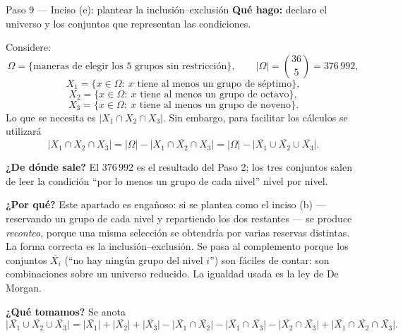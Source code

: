 \documentclass[11pt]{article}
\begin{document}
\begin{paso}{Paso 9 --- Inciso (e): plantear la inclusión--exclusión}
\textbf{Qué hago:} declaro el universo y los conjuntos que representan las condiciones.

Considere:
\[
  \Omega = \{\text{maneras de elegir los 5 grupos sin restricción}\},\qquad |\Omega| = \binom{36}{5} = 376\,992 ,
\]
\[
  X_1 = \{x\in\Omega:\ x \text{ tiene al menos un grupo de séptimo}\},
\]
\[
  X_2 = \{x\in\Omega:\ x \text{ tiene al menos un grupo de octavo}\},
\]
\[
  X_3 = \{x\in\Omega:\ x \text{ tiene al menos un grupo de noveno}\} .
\]
Lo que se necesita es $|X_1\cap X_2\cap X_3|$. Sin embargo, para facilitar los cálculos se utilizará
\[
  |X_1\cap X_2\cap X_3| = |\Omega| - \big|\overline{X_1\cap X_2\cap X_3}\big| = |\Omega| - \big|\overline{X_1}\cup \overline{X_2}\cup \overline{X_3}\big| .
\]

\textbf{¿De dónde sale?} El $376\,992$ es el resultado del Paso 2; los tres conjuntos salen de leer la condición ``por lo menos un grupo de cada nivel'' nivel por nivel.

\textbf{¿Por qué?} Este apartado es engañoso: si se plantea como el inciso (b) --- reservando un grupo de cada nivel y repartiendo los dos restantes --- se produce \emph{reconteo}, porque una misma selección se obtendría por varias reservas distintas. La forma correcta es la inclusión--exclusión. Se pasa al complemento porque los conjuntos $\overline{X_i}$ (``no hay ningún grupo del nivel $i$'') son fáciles de contar: son combinaciones sobre un universo reducido. La igualdad usada es la ley de De Morgan.

\textbf{¿Qué tomamos?} Se anota
\[
  \big|\overline{X_1}\cup \overline{X_2}\cup \overline{X_3}\big| = \big|\overline{X_1}\big|+\big|\overline{X_2}\big|+\big|\overline{X_3}\big| - \big|\overline{X_1}\cap \overline{X_2}\big| - \big|\overline{X_1}\cap \overline{X_3}\big| - \big|\overline{X_2}\cap \overline{X_3}\big| + \big|\overline{X_1}\cap \overline{X_2}\cap \overline{X_3}\big| .
\]
\end{paso}
\end{document}

